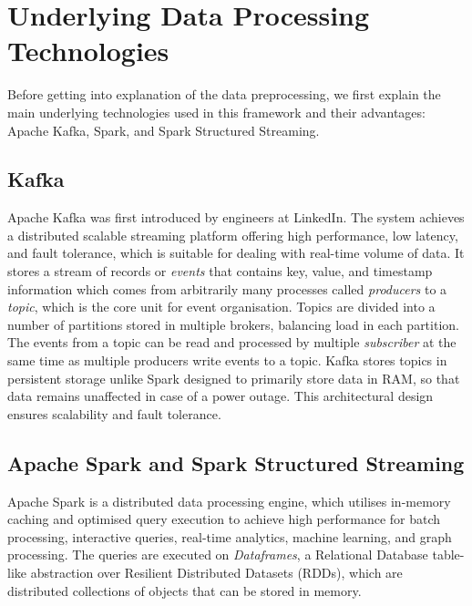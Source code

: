 \documentclass[11pt]{uonthesis}
\begin{document}
\section{Underlying Data Processing Technologies}
Before getting into explanation of the data preprocessing, we first explain the main underlying technologies used in this framework and their advantages: Apache Kafka, Spark, and Spark Structured Streaming.

\subsection{Kafka}

Apache Kafka \cite{Kreps2011KafkaA} was first introduced by engineers at LinkedIn. The system achieves a distributed scalable streaming platform offering high performance, low latency, and fault tolerance, which is suitable for dealing with real-time volume of data. It stores a stream of records or \textit{events} that contains key, value, and timestamp information which comes from arbitrarily many processes called \textit{producers} to a \textit{topic}, which is the core unit for event organisation. Topics are divided into a number of partitions stored in multiple brokers, balancing load in each partition. The events from a topic can be read and processed by multiple \textit{subscriber} at the same time as multiple producers write events to a topic. Kafka stores topics in persistent storage unlike Spark designed to primarily store data in RAM, so that data remains unaffected in case of a power outage. This architectural design ensures scalability and fault tolerance. 

\subsection{Apache Spark and Spark Structured Streaming}

Apache Spark is a distributed data processing engine, which utilises in-memory caching and optimised query execution to achieve high performance for batch processing, interactive queries, real-time analytics, machine learning, and graph processing. The queries are executed on \textit{Dataframes}, a Relational Database table-like abstraction over Resilient Distributed Datasets (RDDs), which are distributed collections of objects that can be stored in memory.
\end{document}

